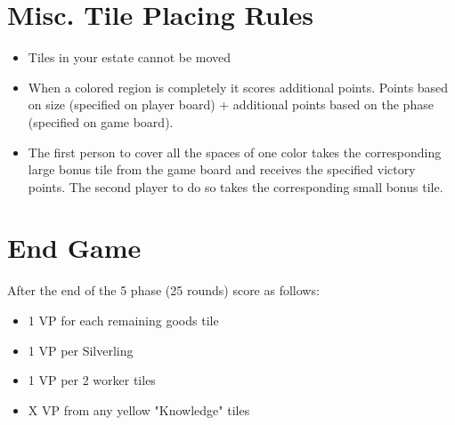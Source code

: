 \documentclass[12pt]{article}
\newenvironment{itemizeCustom}
{\begin{itemize}
  \setlength{\itemsep}{1pt}
  \setlength{\parskip}{0pt}
  \setlength{\parsep}{0pt}}
{\end{itemize}}
\begin{document}
\begin{multicols*}{2}
\section*{Misc. Tile Placing Rules}
\begin{itemizeCustom}
	\item Tiles in your estate cannot be moved
	\item When a colored region is completely it scores additional points. Points based on size (specified on player board) + additional points based on the phase (specified on game board).
	\item The first person to cover all the spaces of one color takes the corresponding large bonus tile from the game board and receives the specified victory points. The second player to do so takes the corresponding small bonus tile.
\end{itemizeCustom}

\section*{End Game}
After the end of the 5 phase (25 rounds) score as follows:

\begin{itemizeCustom}
	\item 1 VP for each remaining goods tile
	\item 1 VP per Silverling
	\item 1 VP per 2 worker tiles
	\item X VP from any yellow "Knowledge" tiles
\end{itemizeCustom}

\end{multicols*}
\end{document}
